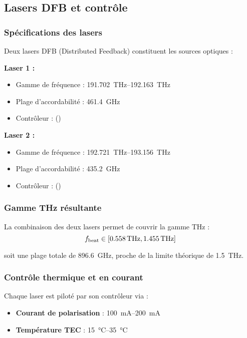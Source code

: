 \subsection{Lasers DFB et contrôle}

\subsubsection{Spécifications des lasers}

Deux lasers DFB (Distributed Feedback) constituent les sources optiques :

\textbf{Laser 1 :}
\begin{itemize}
    \item Gamme de fréquence : \SIrange{191.702}{192.163}{\THz}
    \item Plage d'accordabilité : \SI{461.4}{\GHz}
    \item Contrôleur : \Arroyo{} ()
\end{itemize}

\textbf{Laser 2 :}
\begin{itemize}
    \item Gamme de fréquence : \SIrange{192.721}{193.156}{\THz}
    \item Plage d'accordabilité : \SI{435.2}{\GHz}
    \item Contrôleur : \Arroyo{} ()
\end{itemize}

\subsubsection{Gamme THz résultante}

La combinaison des deux lasers permet de couvrir la gamme THz :
\begin{equation}
\freqbeat \in [\SI{0.558}{\THz}, \SI{1.455}{\THz}]
\end{equation}

soit une plage totale de \SI{896.6}{\GHz}, proche de la limite théorique de \SI{1.5}{\THz}.

\subsubsection{Contrôle thermique et en courant}

Chaque laser est piloté par son contrôleur \Arroyo{} via :
\begin{itemize}
    \item \textbf{Courant de polarisation} : \SIrange{100}{200}{\milli\ampere}
    \item \textbf{Température TEC} : \SIrange{15}{35}{\celsius}
\end{itemize}

